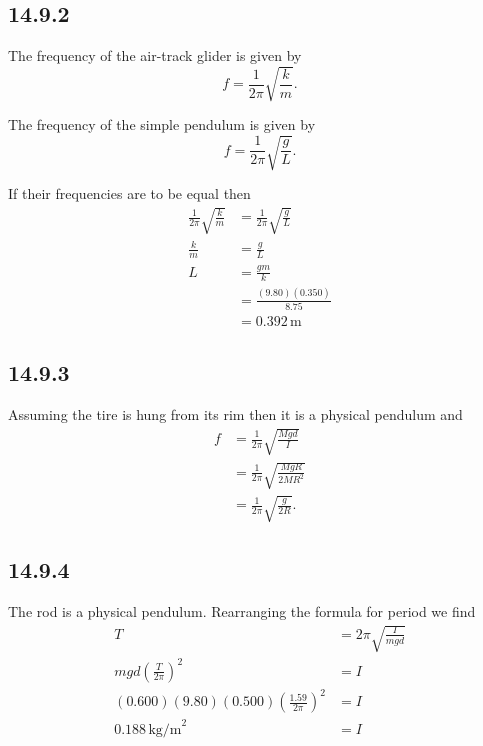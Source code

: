 \documentclass{article}
\begin{document}
\subsection{14.9.2}

The frequency of the air-track glider is given by \[f = \frac{1}{2\pi}\sqrt{\frac{k}{m}}.\]

The frequency of the simple pendulum is given by \[f = \frac{1}{2\pi}\sqrt{\frac{g}{L}}.\]

If their frequencies are to be equal then
\begin{align*}
  \frac{1}{2\pi}\sqrt{\frac{k}{m}} & = \frac{1}{2\pi}\sqrt{\frac{g}{L}} \\
  \frac{k}{m}                      & = \frac{g}{L}                      \\
  L                                & = \frac{gm}{k}                     \\
                                   & = \frac{(9.80)(0.350)}{8.75}       \\
                                   & = 0.392 \,\textrm{m}
\end{align*}

\subsection{14.9.3}

Assuming the tire is hung from its rim then it is a physical pendulum and
\begin{align*}
  f & = \frac{1}{2\pi}\sqrt{\frac{Mgd}{I}}     \\
    & = \frac{1}{2\pi}\sqrt{\frac{MgR}{2MR^2}} \\
    & = \frac{1}{2\pi}\sqrt{\frac{g}{2R}}.
\end{align*}

\subsection{14.9.4}

The rod is a physical pendulum. Rearranging the formula for period we find
\begin{align*}
  T                                                    & = 2\pi\sqrt{\frac{I}{mgd}} \\
  mgd\left(\frac{T}{2\pi}\right)^2                     & = I                        \\
  (0.600)(9.80)(0.500)\left(\frac{1.59}{2\pi}\right)^2 & = I                        \\
  0.188 \,\textrm{kg/m}^2                              & = I
\end{align*}
\end{document}
